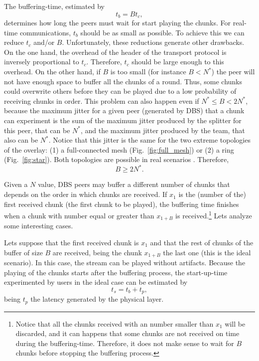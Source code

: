 

\label{sec:buffering_time}
The buffering-time, estimated by
\begin{equation}
  \label{eq:t_b}
  t_b = Bt_c,  %
\end{equation}
determines how long the peers must wait for start playing the
chunks. For real-time communications, $t_b$ should be as small as
possible. To achieve this we can reduce $t_c$ and/or
$B$. Unfortunately, these reductions generate other drawbacks. On
the one hand, the overhead of the header of the transport protocol is
inversely proportional to $t_c$. Therefore, $t_c$ should be large
enough to  this overhead. On the other hand, if $B$
is too small (for instance $B<N^*$) the peer will not have enough
space to buffer all the chunks of a round. Thus, some chunks could
overwrite others before they can be played due to a low probability
of receiving chunks in order. This problem can also
happen even if $N^*\leq B<2N^*$, because the maximum jitter for a
given peer (generated by DBS) that a chunk can experiment is the sum
of the maximum jitter produced by the splitter for this peer, that can
be $N^*$, and the maximum jitter produced by the team, that also can
be $N^*$. Notice that this jitter is the same for the two extreme
topologies of the overlay: (1) a full-connected mesh
(Fig.~\ref{fig:full_mesh}) or (2) a ring (Fig.~\ref{fig:star}). Both topologies are possible in real scenarios . Therefore, 
\begin{equation}
  \label{eq:minimum_B}
  B\ge 2N^*.
\end{equation}

Given a $N$ value, DBS peers may buffer a different number of chunks
that depends on the order in which chunks are received. If $x_1$ is
the (number of the) first received chunk (the first chunk to be
played), the buffering time finishes when a chunk with number equal or
greater than $x_{1+B}$ is received.\footnote{Notice that all the
  chunks received with an number smaller than $x_1$ will be discarded,
  and it can happens that some chunks
  are not received on time during the buffering-time. Therefore, it does not make sense to wait
  for $B$ chunks before stopping the buffering process.} Lets analyze
some interesting cases.

Lets suppose that the first received chunk is $x_1$ and that the rest
of chunks of the buffer of size $B$ are received, being the chunk
$x_{1+B}$ the last one (this is the ideal scenario). In this case, the
stream can be played without artifacts. Because the playing of the
chunks starts after the buffering process, the \gls{start-up-time}
experimented by users in the ideal case can be estimated by
\begin{equation}
  t_s = t_b + t_p,
  \label{eq:start-up-time}
\end{equation}
being $t_p$ the latency generated by the physical layer.

